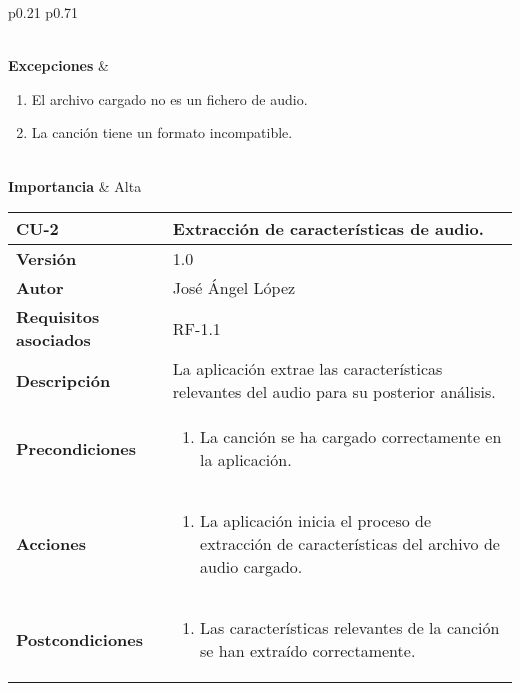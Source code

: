 \begin{table}[p]
\begin{tabularx}{\linewidth}{ p{0.21\columnwidth} p{0.71\columnwidth} }
\begin{enumerate}
		\end{enumerate}\\
		\textbf{Excepciones} &
		\begin{enumerate}
			\def\labelenumi{\arabic{enumi}.}
			\tightlist
			\item El archivo cargado no es un fichero de audio.
			\item La canción tiene un formato incompatible.
		\end{enumerate}\\
		\textbf{Importancia}          & Alta \\
		\bottomrule
	\end{tabularx}
	\caption{CU-1 Carga de la canción}
\end{table}

\begin{table}[p]
	\centering
	\begin{tabularx}{\linewidth}{ p{} p{} }
		\toprule
		\textbf{CU-2}    & \textbf{Extracción de características de audio.}\\
		\toprule
		\textbf{Versión}              & 1.0    \\
		\textbf{Autor}                & José Ángel López \\
		\textbf{Requisitos asociados} & RF-1.1 \\
		\textbf{Descripción}          & La aplicación extrae las características relevantes del audio para su posterior análisis. \\
		\textbf{Precondiciones}        & 
		\begin{enumerate}		    
			\def\labelenumi{\arabic{enumi}.}
			\tightlist
			\item La canción se ha cargado correctamente en la aplicación.
		\end{enumerate}\\
		\textbf{Acciones}             &
		\begin{enumerate}
			\def\labelenumi{\arabic{enumi}.}
			\tightlist
			\item La aplicación inicia el proceso de extracción de características del archivo de audio cargado.
		\end{enumerate}\\
		\textbf{Postcondiciones} &
		\begin{enumerate}
			\def\labelenumi{\arabic{enumi}.}
			\tightlist
			\item Las características relevantes de la canción se han extraído correctamente.

\end{enumerate}
\end{tabularx}
\end{table}
